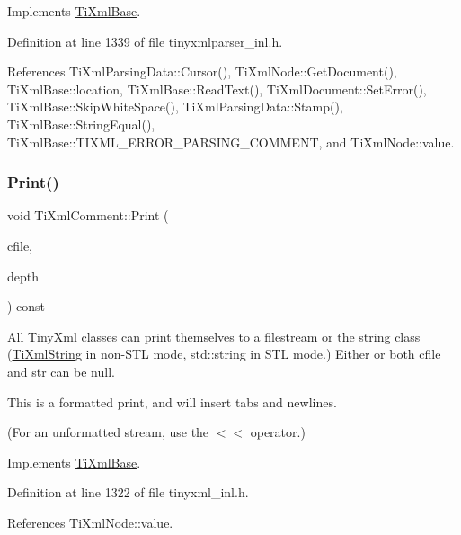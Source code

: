 Implements \hyperlink{class_ti_xml_base_a00e4edb0219d00a1379c856e5a1d2025}{Ti\+Xml\+Base}.



Definition at line 1339 of file tinyxmlparser\+\_\+inl.\+h.



References Ti\+Xml\+Parsing\+Data\+::\+Cursor(), Ti\+Xml\+Node\+::\+Get\+Document(), Ti\+Xml\+Base\+::location, Ti\+Xml\+Base\+::\+Read\+Text(), Ti\+Xml\+Document\+::\+Set\+Error(), Ti\+Xml\+Base\+::\+Skip\+White\+Space(), Ti\+Xml\+Parsing\+Data\+::\+Stamp(), Ti\+Xml\+Base\+::\+String\+Equal(), Ti\+Xml\+Base\+::\+T\+I\+X\+M\+L\+\_\+\+E\+R\+R\+O\+R\+\_\+\+P\+A\+R\+S\+I\+N\+G\+\_\+\+C\+O\+M\+M\+E\+NT, and Ti\+Xml\+Node\+::value.

\hypertarget{class_ti_xml_comment_a873171beac19d40f0eaae945711c98ed}{}\label{class_ti_xml_comment_a873171beac19d40f0eaae945711c98ed} 
\subsubsection{\texorpdfstring{Print()}{Print()}}
{\footnotesize\ttfamily void Ti\+Xml\+Comment\+::\+Print (\begin{DoxyParamCaption}\item[{F\+I\+LE $\ast$}]{cfile,  }\item[{int}]{depth }\end{DoxyParamCaption}) const\hspace{0.3cm}{\ttfamily [virtual]}}

All Tiny\+Xml classes can print themselves to a filestream or the string class (\hyperlink{class_ti_xml_string}{Ti\+Xml\+String} in non-\/\+S\+TL mode, std\+::string in S\+TL mode.) Either or both cfile and str can be null.

This is a formatted print, and will insert tabs and newlines.

(For an unformatted stream, use the $<$$<$ operator.) 

Implements \hyperlink{class_ti_xml_base_a0de56b3f2ef14c65091a3b916437b512}{Ti\+Xml\+Base}.



Definition at line 1322 of file tinyxml\+\_\+inl.\+h.



References Ti\+Xml\+Node\+::value.

\hypertarget{class_ti_xml_comment_ad69c1024082f716462b6fd4b94488320}{}\label{class_ti_xml_comment_ad69c1024082f716462b6fd4b94488320} 
